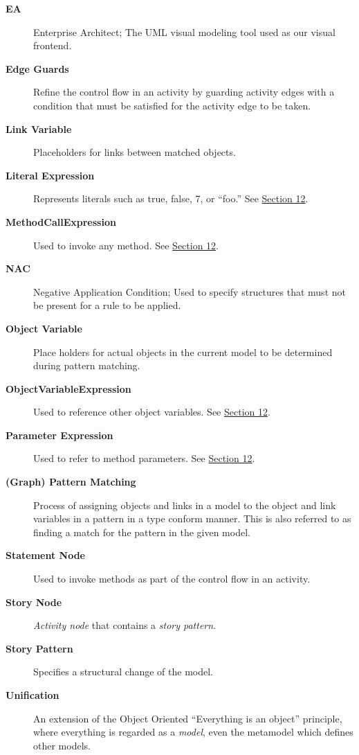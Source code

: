 \begin{description}
\item[\bf EA]
Enterprise Architect; The UML visual modeling tool used as our visual frontend.

\item[\bf Edge Guards]
Refine the control flow in an activity by guarding activity edges with a condition that must be satisfied for the activity edge to be taken.

\item[\bf Link Variable]
Placeholders for links between matched objects.

\item[\bf Literal Expression]
Represents literals such as true, false, 7, or ``foo.'' See \hyperlink{expressionReview}{Section 12}.

\item[\bf MethodCallExpression]
Used to invoke any method. See \hyperlink{expressionReview}{Section 12}.

\item[\bf NAC]
Negative Application Condition; Used to specify structures that must not be present for a rule to be applied.
	
\item[\bf Object Variable]
Place holders for actual objects in the current model to be determined during pattern matching.

\item[\bf ObjectVariableExpression]
Used to reference other object variables. See \hyperlink{expressionReview}{Section 12}.

\item[\bf Parameter Expression]
Used to refer to method parameters. See \hyperlink{expressionReview}{Section 12}.

\item[\bf (Graph) Pattern Matching]
Process of assigning objects and links in a model to the object and link variables in a pattern in a type conform manner. This is also referred to as finding a
match for the pattern in the given model.

\item[\bf Statement Node]
Used to invoke methods as part of the control flow in an activity.

\item[\bf Story Node]
\emph{Activity node} that contains a \emph{story pattern}.

\item[\bf Story Pattern]
Specifies a structural change of the model.

\item[\bf Unification]
An extension of the Object Oriented ``Everything is an object'' principle, where everything is regarded as a \emph{model}, even the metamodel which defines
other models.

\end{description}
